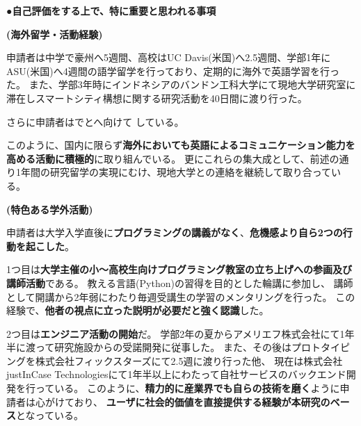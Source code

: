 {\noindent
●\textbf{自己評価をする上で、特に重要と思われる事項}

%

\textbf{(海外留学・活動経験)}

申請者は中学で豪州へ5週間、高校はUC Davis(米国)へ2.5週間、学部1年にASU(米国)へ4週間の語学留学を行っており、定期的に海外で英語学習を行った。
また、学部3年時にインドネシアのバンドン工科大学にて現地大学研究室に滞在しスマートシティ構想に関する研究活動を40日間に渡り行った。

さらに申請者はでとへ向けて
している。

このように、国内に限らず\textbf{海外においても英語によるコミュニケーション能力を高める活動に積極的}に取り組んでいる。
更にこれらの集大成として、前述の通り1年間の研究留学の実現にむけ、現地大学との連絡を継続して取り合っている。

\textbf{(特色ある学外活動)}

申請者は大学入学直後に\textbf{プログラミングの講義がなく}、\textbf{危機感より自ら2つの行動を起こした}。

1つ目は\textbf{大学主催の小〜高校生向けプログラミング教室の立ち上げへの参画及び講師活動}\cite{uecprog}である。
教える言語(Python)の習得を目的とした輪講に参加し、
講師として開講から2年弱にわたり毎週受講生の学習のメンタリングを行った。
この経験で、\textbf{他者の視点に立った説明が必要だと強く認識}した。

2つ目は\textbf{エンジニア活動の開始}だ。
学部2年の夏からアメリエフ株式会社にて1年半に渡って研究施設からの受諾開発に従事した\cite{amelieff}。
また、その後はプロトタイピングを株式会社フィックスターズにて2.5週に渡り行った他、
現在は株式会社justInCase Technologiesにて1年半以上にわたって自社サービスのバックエンド開発を行っている\cite{jic-tech}。
このように、\textbf{精力的に産業界でも自らの技術を磨く}ように申請者は心がけており、
\textbf{ユーザに社会的価値を直接提供する経験が本研究のベース}となっている。

}
